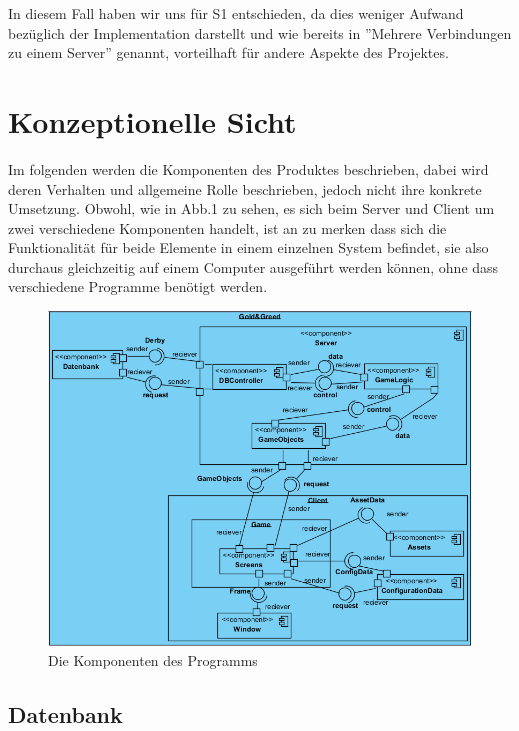 \documentclass[fontsize=12pt,paper=a4,twoside]{scrartcl}
\begin{document}
In diesem Fall haben wir uns für S1 entschieden, da dies weniger Aufwand bezüglich der Implementation darstellt und wie bereits in ''Mehrere Verbindungen zu einem Server'' genannt, vorteilhaft für andere Aspekte des Projektes.




\section{Konzeptionelle Sicht}
\label{sec:konzeptionell}

Im folgenden werden die Komponenten des Produktes beschrieben, dabei wird deren Verhalten und allgemeine Rolle beschrieben, jedoch nicht ihre konkrete Umsetzung. Obwohl, wie in Abb.1 zu sehen, es sich beim Server und Client um zwei verschiedene Komponenten handelt, ist an zu merken dass sich die Funktionalität für beide Elemente in einem einzelnen System befindet, sie also durchaus gleichzeitig auf einem Computer ausgeführt werden können, ohne dass verschiedene Programme benötigt werden.

\begin{figure}[h]
\centering
\includegraphics[width=1\linewidth]{ComponentDiagram1}
\caption[Komponenten des Programms]{Die Komponenten des Programms}
\label{fig:ComponentDiagram1}
\end{figure}

\subsection{Datenbank}
\end{document}

